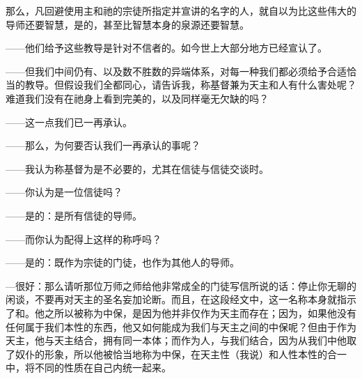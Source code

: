 那么，凡回避使用主和祂的宗徒所指定并宣讲的名字的人，就自以为比这些伟大的导师还要智慧，是的，甚至比智慧本身的泉源还要智慧。\par

——他们给予这些教导是针对不信者的。如今世上大部分地方已经宣认了。\par

——但我们中间仍有、以及数不胜数的异端体系，对每一种我们都必须给予合适恰当的教导。但假设我们全都同心，请告诉我，称基督兼为天主和人有什么害处呢？难道我们没有在祂身上看到完美的，以及同样毫无欠缺的吗？\par

——这一点我们已一再承认。\par

——那么，为何要否认我们一再承认的事呢？\par

——我认为称基督为是不必要的，尤其在信徒与信徒交谈时。\par

——你认为是一位信徒吗？\par

——是的：是所有信徒的导师。\par

——而你认为配得上这样的称呼吗？\par

——是的：既作为宗徒的门徒，也作为其他人的导师。\par

—很好：那么请听那位万师之师给他非常成全的门徒写信所说的话：停止你无聊的闲谈，不要再对天主的圣名妄加论断。而且，在这段经文中，这一名称本身就指示了和。他之所以被称为中保，是因为他并非仅作为天主而存在；因为，如果他没有任何属于我们本性的东西，他又如何能成为我们与天主之间的中保呢？但由于作为天主，他与天主结合，拥有同一本体；而作为人，与我们结合，因为从我们中他取了奴仆的形象，所以他被恰当地称为中保，在天主性（我说）和人性本性的合一中，将不同的性质在自己内统一起来。\par

